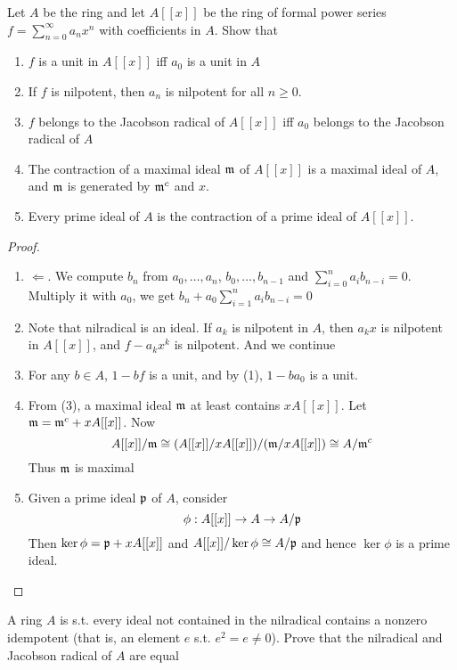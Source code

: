 \documentclass[11pt]{article}
\begin{document}
\begin{exercise}
\label{1.5}
Let \(A\) be the ring and let \(A[[x]]\) be the ring of formal power series \(f=\sum_{n=0}^\infty a_nx^n\)
with coefficients in \(A\). Show that
\begin{enumerate}
\item \(f\) is a unit in \(A[[x]]\) iff \(a_0\) is a unit in \(A\)
\item If \(f\) is nilpotent, then \(a_n\) is nilpotent for all \(n\ge 0\).
\item \(f\) belongs to the Jacobson radical of \(A[[x]]\) iff \(a_0\) belongs to the Jacobson radical
of \(A\)
\item The contraction of a maximal ideal \(\mathfrak{m}\) of \(A[[x]]\) is a maximal ideal of \(A\), and \(\mathfrak{m}\) is
generated by \(\mathfrak{m}^c\) and \(x\).
\item Every prime ideal of \(A\) is the contraction of a prime ideal of \(A[[x]]\).
\end{enumerate}
\end{exercise}

\begin{proof}
\begin{enumerate}
\item \(\Leftarrow\). We compute \(b_n\) from \(a_0,\dots,a_n\), \(b_0,\dots,b_{n-1}\)  and \(\sum_{i=0}^na_ib_{n-i}=0\).
Multiply it with \(a_0\), we get \(b_n+a_0\sum_{i=1}^na_ib_{n-i}=0\)
\item Note that nilradical is an ideal. If \(a_k\) is nilpotent in \(A\), then \(a_kx\) is
nilpotent in \(A[[x]]\), and \(f-a_kx^k\) is nilpotent. And we continue
\item For any \(b\in A\), \(1-bf\) is a unit, and by (1), \(1-ba_0\) is a unit.
\item From (3), a maximal ideal \(\mathfrak{m}\) at least contains \(xA[[x]]\). Let \(\mathfrak{m}=\mathfrak{m}^c+xA[[x]]\).
Now
\begin{equation*}
A[[x]]/\mathfrak{m}\cong(A[[x]]/xA[[x]])/(\mathfrak{m}/xA[[x]])\cong A/\mathfrak{m}^c
\end{equation*}
Thus \(\mathfrak{m}\) is maximal
\item Given a prime ideal \(\mathfrak{p}\) of \(A\), consider
\begin{equation*}
\phi:A[[x]]\to A\to A/\mathfrak{p}
\end{equation*}
Then \(\ker\phi=\mathfrak{p}+xA[[x]]\) and \(A[[x]]/\ker\phi\cong A/\mathfrak{p}\) and hence \(\ker\phi\) is a prime ideal.
\end{enumerate}
\end{proof}

\begin{exercise}
\label{ex1.6}
A ring \(A\) is s.t. every ideal not contained in the nilradical contains a nonzero idempotent
(that is, an element \(e\) s.t. \(e^2=e\neq 0\)). Prove that the nilradical and Jacobson radical
of \(A\) are equal
\end{exercise}
\end{document}
